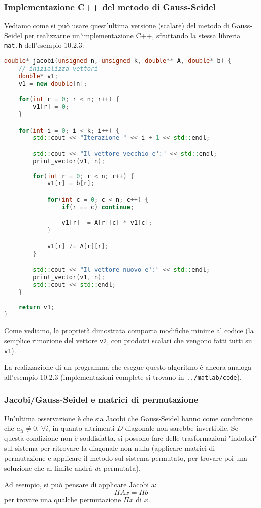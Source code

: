 \documentclass[a4paper,11pt]{article}
\begin{document}
\subsubsection{Implementazione C++ del metodo di Gauss-Seidel}
Vediamo come si può usare quest'ultima versione (scalare) del metodo di Gauss-Seidel per realizzarne un'implementazione C++, sfruttando la stessa libreria \lstinline|mat.h| dell'esempio 10.2.3:
\begin{lstlisting}[language=C++, style=codestyle]	
double* jacobi(unsigned n, unsigned k, double** A, double* b) {
	// inizializza vettori
	double* v1;
	v1 = new double[n];

	for(int r = 0; r < n; r++) {
		v1[r] = 0;
	}

	for(int i = 0; i < k; i++) {
		std::cout << "Iterazione " << i + 1 << std::endl;

		std::cout << "Il vettore vecchio e':" << std::endl;
		print_vector(v1, n);
		
		for(int r = 0; r < n; r++) {
			v1[r] = b[r];

			for(int c = 0; c < n; c++) {
				if(r == c) continue;

				v1[r] -= A[r][c] * v1[c];
			}

			v1[r] /= A[r][r];
		}

		std::cout << "Il vettore nuovo e':" << std::endl;
		print_vector(v1, n);
		std::cout << std::endl;
	}
	
	return v1;
}
\end{lstlisting}

Come vediamo, la proprietà dimostrata comporta modifiche minime al codice (la semplice rimozione del vettore \lstinline|v2|, con prodotti scalari che vengono fatti tutti su \lstinline|v1|).

La realizzazione di un programma che esegue questo algoritmo è ancora analoga all'esempio 10.2.3 (implementazioni complete si trovano in \lstinline|../matlab/code|).

\subsubsection{Jacobi/Gauss-Seidel e matrici di permutazione}
Un'ultima osservazione è che sia Jacobi che Gauss-Seidel hanno come condizione che $a_{ii} \neq 0, \, \forall i$, in quanto altrimenti $D$ diagonale non sarebbe invertibile.
Se questa condizione non è soddisfatta, si possono fare delle trasformazioni "indolori" sul sistema per ritrovare la diagonale non nulla (applicare matrici di permutazione e applicare il metodo sul sistema permutato, per trovare poi una soluzione che al limite andrà \textit{de}-permutata).

Ad esempio, si può pensare di applicare Jacobi a:
$$
\Pi A x = \Pi b
$$
per trovare una qualche permutazione $\Pi x$ di $x$.
\end{document}
